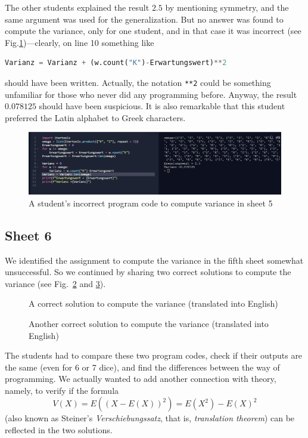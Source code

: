 \documentclass[]{interact}
\theoremstyle{plain}%
\theoremstyle{definition}
\theoremstyle{remark}
\begin{document}
The other students explained the result $2.5$ by mentioning symmetry, and the same argument was
used for the generalization. But no answer was found to compute the variance, only for one student,
and in that case it was incorrect (see Fig.\ref{52})---clearly, on line 10 something like
\begin{lstlisting}[language=Python,firstnumber=10]
  Varianz = Varianz + (w.count("K")-Erwartungswert)**2
\end{lstlisting}
should have been written. Actually, the notation \texttt{**2} could be something unfamiliar
for those who never did any programming before. Anyway, the result $0.078125$ should have been
suspicious. It is also remarkable that this student preferred the Latin alphabet to Greek characters.
\begin{figure}
\begin{center}\includegraphics[width=1.0\textwidth]{52}
\caption{A student's incorrect program code to compute variance in sheet 5}
\label{52}
\end{center}
\end{figure}

\subsection*{Sheet 6}

We identified the assignment to compute the variance in the fifth sheet somewhat unsuccessful.
So we continued by sharing two correct solutions to compute the variance (see Fig.~\ref{6a.py}
and \ref{6b.py}).

\begin{figure}

\caption{A correct solution to compute the variance (translated into English)}
\label{6a.py}
\end{figure}

\begin{figure}

\caption{Another correct solution to compute the variance (translated into English)}
\label{6b.py}
\end{figure}

The students had to compare these two program codes, check if their outputs are the same
(even for 6 or 7 dice), and find the differences between the way of programming.
We actually wanted to add another connection with theory, namely, to verify if the
formula
\begin{equation}
V(X)=E((X-E(X))^2)=E(X^2)-E(X)^2
\label{variance}
\end{equation}
(also known as Steiner's \textit{Verschiebungssatz}, that is, \textit{translation theorem})
can be reflected in the two solutions.
\end{document}

